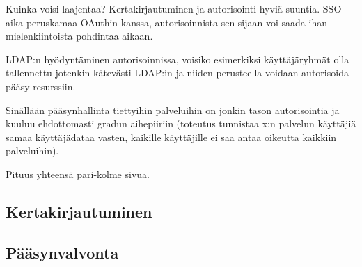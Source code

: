 Kuinka voisi laajentaa? Kertakirjautuminen ja autorisointi hyviä suuntia. SSO aika peruskamaa OAuthin kanssa, autorisoinnista sen sijaan voi saada ihan mielenkiintoista pohdintaa aikaan.

LDAP:n hyödyntäminen autorisoinnissa, voisiko esimerkiksi käyttäjäryhmät olla tallennettu jotenkin kätevästi LDAP:in ja niiden perusteella voidaan autorisoida pääsy resurssiin.

Sinällään pääsynhallinta tiettyihin palveluihin on jonkin tason autorisointia ja kuuluu ehdottomasti gradun aihepiiriin (toteutus tunnistaa x:n palvelun käyttäjiä samaa käyttäjädataa vasten, kaikille käyttäjille ei saa antaa oikeutta kaikkiin palveluihin).

Pituus yhteensä pari-kolme sivua.


\subsection{Kertakirjautuminen}

\subsection{Pääsynvalvonta}

